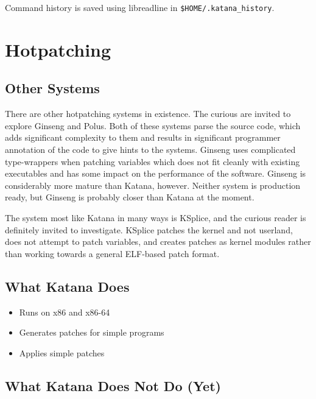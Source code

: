 \documentclass[11pt]{article}
\begin{document}
    Command history is saved using libreadline in \texttt{\$HOME/.katana\_history}.
\section{Hotpatching}
\label{sec-3}

\subsection{Other Systems}
\label{sec-3.1}

   There are other hotpatching systems in existence. The curious are
   invited to explore Ginseng and Polus. Both of these systems parse
   the source code, which adds significant complexity to them and
   results in significant programmer annotation of the code to give
   hints to the systems. Ginseng uses complicated type-wrappers
   when patching variables which does not fit cleanly with existing
   executables and has some impact on the performance of the
   software. Ginseng is considerably more mature than Katana,
   however. Neither system is production ready, but Ginseng is probably
   closer than Katana at the moment.

   The system most like Katana in many ways is KSplice, and the curious
   reader is definitely invited to investigate. KSplice patches the
   kernel and not userland, does not attempt to patch variables, and
   creates patches as kernel modules rather than working towards a
   general ELF-based patch format.
\subsection{What Katana Does}
\label{sec-3.2}

\begin{itemize}
\item Runs on x86 and x86-64
\item Generates patches for simple programs
\item Applies simple patches
\end{itemize}
\subsection{What Katana Does Not Do (Yet)}
\label{sec-3.3}
\end{document}
